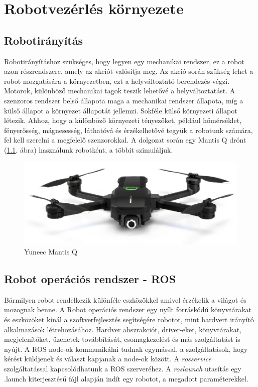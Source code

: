 \chapter{Robotvezérlés környezete}
\section{Robotirányítás}
Robotirányításhoz szükséges, hogy legyen egy mechanikai rendszer, ez a robot azon részrendszere, amely az akciót valósítja meg. Az akció során szükség lehet a robot mozgatására a környezetben,
ezt a helyváltoztató berendezés végzi. Motorok, különböző mechanikai tagok teszik lehetővé a helyváltoztatást. A szenzoros rendszer belső állapota maga a mechanikai rendszer állapota, míg a külső állapot a környezet állapotát jellemzi.
Sokféle külső környezeti állapot létezik. Ahhoz, hogy a különböző környezeti tényezőket, például hőmérséklet, fényerősség, mágnesesség, láthatóvá és érzékelhetővé tegyük a robotunk számára, fel kell szerelni a megfelelő szenzorokkal.
A dolgozat során egy Mantis Q drónt (\ref{fig:mantisq}. ábra) használunk robotként, a többit szimuláljuk.

\begin{figure}
	\centering
	\includegraphics[width=\linewidth]{figures/mantisq.jpg}
	\caption{Yuneec Mantis Q \cite{mantisq}}
	\label{fig:mantisq}
\end{figure}

\section{Robot operációs rendszer - ROS}
Bármilyen robot rendelkezik különféle eszközökkel amivel érzékelik a világot és mozognak benne. A Robot operációs rendszer egy nyílt forráskódú könyvtárakat és eszközöket kínál a szoftverfejlesztés segítségére robotot, mint hardvert irányító alkalmazások létrehozásához. Hardver abszrakciót, driver-eket, könyvtárakat, megjelenítőket, üzenetek továbbítását, csomagkezelést és más szolgáltatást is nyújt. \cite{roswiki}
A ROS node-ok kommunikálni tudnak egymással, a szolgáltatások, hogy kérést küldjenek és választ kapjanak a node-ok között. A \emph{rosservice} szolgáltatással kapcsolódhatunk a ROS szerveréhez.
A \emph{roslaunch} utasítás egy .launch kiterjesztésű fájl alapján indít egy robotot, a megadott paraméterekkel.


